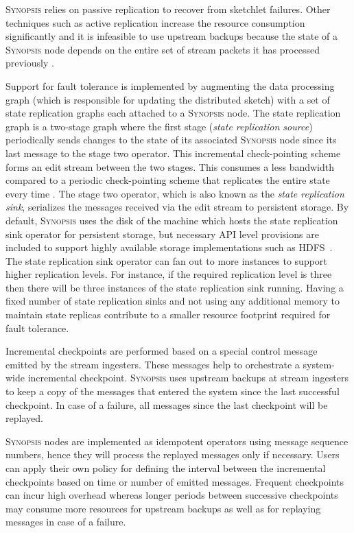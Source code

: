 \textsc{Synopsis} relies on passive replication to recover from sketchlet failures.
Other techniques such as active replication increase the resource consumption significantly and it is infeasible to use upstream backups because the state of a \textsc{Synopsis} node depends on the entire set of stream packets it has processed previously \cite{castro2013integrating}.

Support for fault tolerance is implemented by augmenting the data processing graph (which is responsible for updating the distributed sketch) 	with a set of state replication graphs each attached to a \textsc{Synopsis} node.
The state replication graph is a two-stage graph where the first stage (\textit{state replication source}) periodically sends changes to the state of its associated \textsc{Synopsis} node since its last message to the stage two operator.
This incremental check-pointing scheme forms an edit stream between the two stages.
This consumes a less bandwidth compared to a periodic check-pointing scheme that replicates the entire state every time \cite{castro2013integrating}.
The stage two operator, which is also known as the \textit{state replication sink}, serializes the messages received via the edit stream to persistent storage.
By default, \textsc{Synopsis} uses the disk of the machine which hosts the state replication sink operator for persistent storage, but necessary API level provisions are included to support highly available storage implementations such as HDFS~\cite{borthakur2008hdfs}.
The state replication sink operator can fan out to more instances to support higher replication levels.
For instance, if the required replication level is three then there will be three instances of the state replication sink running.
Having a fixed number of state replication sinks and not using any additional memory to maintain state replicas contribute to a smaller resource footprint required for fault tolerance.

Incremental checkpoints are performed based on a special control message emitted by the stream ingesters.
These messages help to orchestrate a system-wide incremental checkpoint.
\textsc{Synopsis} uses upstream backups at stream ingesters to keep a copy of the messages that entered the system since the last successful checkpoint.
In case of a failure, all messages since the last checkpoint will be replayed.

\textsc{Synopsis} nodes are implemented as idempotent operators using message sequence numbers, hence they will process the replayed messages only if necessary.
Users can apply their own policy for defining the interval between the incremental checkpoints based on time or number of emitted messages.
Frequent checkpoints can incur high overhead whereas longer periods between successive checkpoints may consume more resources for upstream backups as well as for replaying messages in case of a failure.

